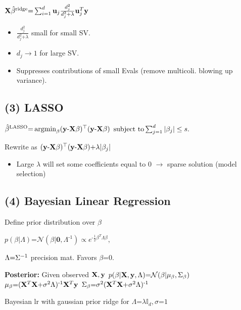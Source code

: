 $
	\mathbf X\hat\beta^{\text{ridge}} 
	\text{=} \sum_{i = 1}^{d} \mathbf u_j  \frac{d_{j}^2}{d_{j}^2 \text{+} \lambda} \mathbf u_{j}^T\mathbf y 
$


\begin{itemize}
	\item $\frac{d_j^2}{d_j^2 \text{+} \lambda}$ small for small SV.
	\item  $d_j\to 1$ for large SV. 
	\item Suppresses contributions of small Evals (remove multicoli. blowing up variance).
\end{itemize}


\subsection*{(3) LASSO}
$	\hat\beta^{\text{LASSO}} \text{=} \mathop{\mathrm{argmin}}_\beta (\mathbf y \text{-} \mathbf X\beta)^\top(\mathbf y\text{-}\mathbf X\beta)$ $
	\text{subject to} \sum_{j = 1}^{d}|\beta_j| \leq s.
$

Rewrite as
$ (\mathbf y \text{-} \mathbf X\beta)^\top(\mathbf y \text{-} \mathbf X\beta) \text{+} \lambda|\beta_j|$


\begin{itemize}
	\item Large $\lambda$ will set some coefficients equal to $0$ $\to$ sparse solution (model selection)
\end{itemize}

\subsection*{(4) Bayesian Linear Regression} 
Define prior distribution over $\beta$

$
	p(\beta|\Lambda) \text{=} \mathcal N(\beta|\mathbf 0, \Lambda^{\text{-}1})\propto e^{\text{-}\frac{1}{2} \beta^T\Lambda\beta},
$

$\Lambda \text{=} {\Sigma}^{-1}$ precision mat.
Favors $\beta$=$0$. 

\textbf{Posterior:} Given observed $\mathbf X, \mathbf y$
$p(\beta| \mathbf X, \mathbf y, \Lambda) \text{=} \mathcal{N} (\beta|\mu_\beta, \Sigma_{\beta})$ 
							$\mu_\beta	\text{=} (\mathbf X^T \mathbf X \text{+} \sigma^2\Lambda)^{\text{-}1}\mathbf X^T \mathbf y $ 
							$\Sigma_\beta \text{=} \sigma^2(\mathbf X^T \mathbf X \text{+} \sigma^2\Lambda)^{\text{-}1} $

Bayesian lr with gaussian prior \text{=} ridge for $\Lambda \text{=}\lambda \mathbb I_d, \sigma\text{=}1$




